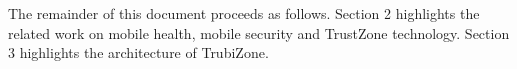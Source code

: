 %
%
%
%
The remainder of this document proceeds as follows. Section 2 highlights the related work on mobile health, mobile security and TrustZone technology. Section 3 highlights the architecture of TrubiZone.
